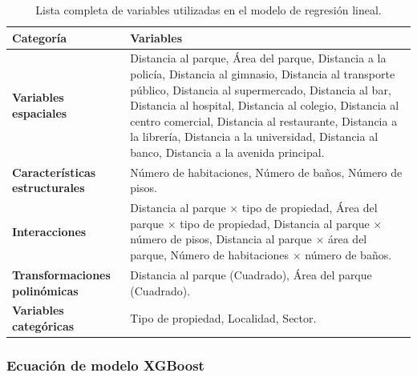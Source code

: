 \documentclass[a4paper]{article}
\theoremstyle{remark}
\theoremstyle{definition}
\begin{document}
\begin{table}[h!]
\centering
\begin{tabular}{l|p{12cm}}
\hline
\textbf{Categoría} & \textbf{Variables} \\ \hline
\textbf{Variables espaciales} & Distancia al parque, Área del parque, Distancia a la policía, Distancia al gimnasio, Distancia al transporte público, Distancia al supermercado, Distancia al bar, Distancia al hospital, Distancia al colegio, Distancia al centro comercial, Distancia al restaurante, Distancia a la librería, Distancia a la universidad, Distancia al banco, Distancia a la avenida principal. \\ \hline
\textbf{Características estructurales} & Número de habitaciones, Número de baños, Número de pisos. \\ \hline
\textbf{Interacciones} & Distancia al parque \(\times\) tipo de propiedad, Área del parque \(\times\) tipo de propiedad, Distancia al parque \(\times\) número de pisos, Distancia al parque \(\times\) área del parque, Número de habitaciones \(\times\) número de baños. \\ \hline
\textbf{Transformaciones polinómicas} & Distancia al parque (Cuadrado), Área del parque (Cuadrado). \\ \hline
\textbf{Variables categóricas} & Tipo de propiedad, Localidad, Sector. \\ \hline
\end{tabular}
\caption{Lista completa de variables utilizadas en el modelo de regresión lineal.}
\label{tab:variables_regresion_lineal}
\end{table}



\subsubsection{Ecuación de modelo XGBoost}
\end{document}
